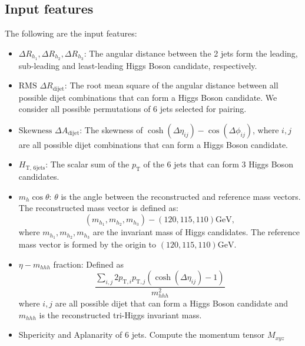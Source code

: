 \documentclass[12pt]{article}
\begin{document}
    \subsection{Input features}%
    \label{sub:input_features}
        The following are the input features:
        \begin{itemize}
            \item $\Delta R_{h_1}, \Delta R_{h_2}, \Delta R_{h_3}$: The angular distance between the 2 jets form the leading, sub-leading and least-leading Higgs Boson candidate, respectively.
            \item $\text{RMS } \Delta R_{\text{dijet}}$: The root mean square of the angular distance between all possible dijet combinations that can form a Higgs Boson candidate. We consider all possible permutations of 6 jets selected for pairing.
            \item $\text{Skewness } \Delta A_{\text{dijet}}$: The skewness of $\cosh\left( \Delta\eta_{ij} \right) - \cos\left( \Delta\phi_{ij} \right) $, where $i,j$ are all possible dijet combinations that can form a Higgs Boson candidate.
            \item $H_{\text{T, 6jets}}$: The scalar sum of the $p_{\text{T}}$ of the 6 jets that can form 3 Higgs Boson candidates.
            \item $m_{h}\cos\theta$: $\theta$ is the angle between the reconstructed and reference mass vectors. The reconstructed mass vector is defined as:
                \begin{equation}
                    \left( m_{h_1}, m_{h_2}, m_{h_3} \right) - \left( 120, 115, 110 \right) \text{GeV},
                \end{equation}
                where $m_{h_1}, m_{h_2}, m_{h_3}$ are the invariant mass of Higgs candidates. The reference mass vector is formed by the origin to $\left( 120, 115, 110 \right) \text{GeV}$.
            \item $\eta - m_{hhh}$ fraction: Defined as
            \begin{equation}
            \frac{\sum_{i,j} 2 p_{\text{T},i} p_{\text{T},j} \left( \cosh\left( \Delta\eta_{ij} \right) -1 \right) }{m_{hhh}^2}
            \end{equation}
            where $i,j$ are all possible dijet that can form a Higgs Boson candidate and $m_{hhh}$ is the reconstructed tri-Higgs invariant mass.
            \item Shpericity and Aplanarity of 6 jets. Compute the momentum tensor $M_{xyz}$
               \begin{equation}

\end{equation}
\end{itemize}
\end{document}
